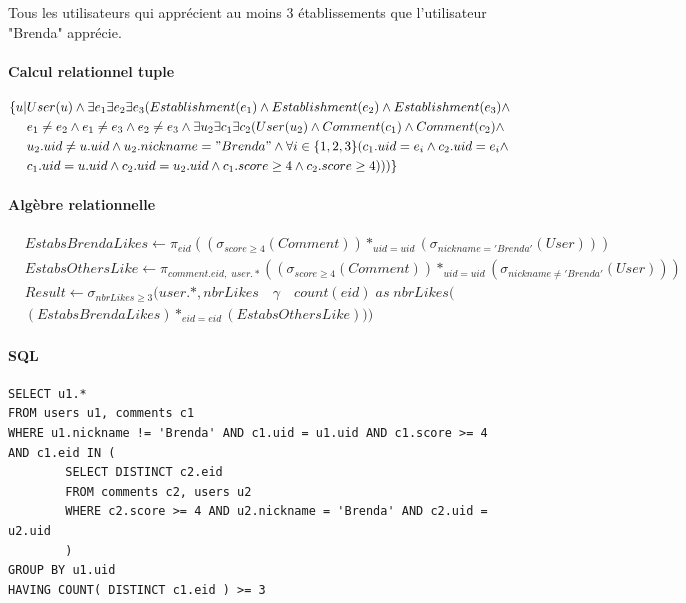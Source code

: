 \documentclass[11pt,a4paper]{report}
\begin{document}
\noindent Tous les utilisateurs qui apprécient au moins 3 établissements que l'utilisateur "Brenda" apprécie.
\paragraph*{Calcul relationnel tuple}
\begin{align*}
\{ u | & User(u) \wedge \exists e_{1} \exists e_{2} \exists e_{3} ( Establishment(e_{1}) \wedge
Establishment(e_{2}) \wedge Establishment(e_{3}) \wedge \\ 
& e_{1} \neq e_{2} \wedge e_{1} \neq e_{3} \wedge e_{2} \neq e_{3} \wedge \exists u_{2} \exists c_{1} \exists c_{2} ( User(u_{2}) \wedge Comment(c_{1}) \wedge Comment(c_{2}) \wedge \\
& u_{2}.uid \neq u.uid \wedge u_{2}.nickname = "Brenda" \wedge \forall i \in \{1,2,3 \}(c_{1}.uid=e_{i} \wedge c_{2}.uid=e_{i} \wedge  \\
& c_{1}.uid = u.uid \wedge c_{2}.uid = u_{2}.uid \wedge  c_{1}.score \geq 4 \wedge  c_{2}.score \geq 4  )))
\}
\end{align*}
\paragraph*{Algèbre relationnelle}
\begin{align*}
& EstabsBrendaLikes \leftarrow \pi_{eid} ( ( \sigma_{score \ge 4} (Comment)) *_{uid=uid} (\sigma_{nickname = 'Brenda'} (User)) ) \\
& EstabsOthersLike \leftarrow \pi_{comment.eid, \; user.*} ( ( \sigma_{score \ge 4} (Comment)) *_{uid=uid} (\sigma_{nickname \neq 'Brenda'} (User)) )\\ 
& Result \leftarrow \sigma_{nbrLikes \ge 3} (user.*, nbrLikes \quad \gamma \quad count(eid) \; as\;  nbrLikes ( \\
& (EstabsBrendaLikes)*_{eid=eid}(EstabsOthersLike)) )
\end{align*}


\paragraph*{SQL}
\begin{verbatim}
SELECT u1.*
FROM users u1, comments c1
WHERE u1.nickname != 'Brenda' AND c1.uid = u1.uid AND c1.score >= 4 AND c1.eid IN (
        SELECT DISTINCT c2.eid
        FROM comments c2, users u2
        WHERE c2.score >= 4 AND u2.nickname = 'Brenda' AND c2.uid = u2.uid
        )
GROUP BY u1.uid
HAVING COUNT( DISTINCT c1.eid ) >= 3
\end{verbatim}
\end{document}
